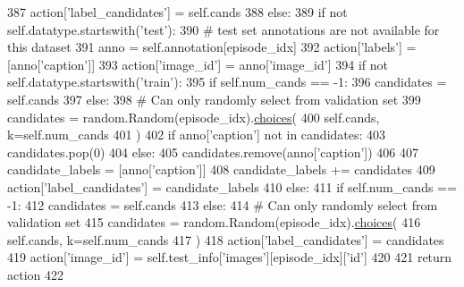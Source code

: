 \begin{DoxyCode}
387                     action[\textcolor{stringliteral}{'label\_candidates'}] = self.cands
388         \textcolor{keywordflow}{else}:
389             \textcolor{keywordflow}{if} \textcolor{keywordflow}{not} self.datatype.startswith(\textcolor{stringliteral}{'test'}):
390                 \textcolor{comment}{# test set annotations are not available for this dataset}
391                 anno = self.annotation[episode\_idx]
392                 action[\textcolor{stringliteral}{'labels'}] = [anno[\textcolor{stringliteral}{'caption'}]]
393                 action[\textcolor{stringliteral}{'image\_id'}] = anno[\textcolor{stringliteral}{'image\_id'}]
394                 \textcolor{keywordflow}{if} \textcolor{keywordflow}{not} self.datatype.startswith(\textcolor{stringliteral}{'train'}):
395                     \textcolor{keywordflow}{if} self.num\_cands == -1:
396                         candidates = self.cands
397                     \textcolor{keywordflow}{else}:
398                         \textcolor{comment}{# Can only randomly select from validation set}
399                         candidates = random.Random(episode\_idx).\hyperlink{namespaceparlai_1_1mturk_1_1tasks_1_1personachat_1_1personachat__chat_1_1extract__and__save__personas_a71338ed717c1e7ba7c54bfff02589e4e}{choices}(
400                             self.cands, k=self.num\_cands
401                         )
402                     \textcolor{keywordflow}{if} anno[\textcolor{stringliteral}{'caption'}] \textcolor{keywordflow}{not} \textcolor{keywordflow}{in} candidates:
403                         candidates.pop(0)
404                     \textcolor{keywordflow}{else}:
405                         candidates.remove(anno[\textcolor{stringliteral}{'caption'}])
406 
407                     candidate\_labels = [anno[\textcolor{stringliteral}{'caption'}]]
408                     candidate\_labels += candidates
409                     action[\textcolor{stringliteral}{'label\_candidates'}] = candidate\_labels
410             \textcolor{keywordflow}{else}:
411                 \textcolor{keywordflow}{if} self.num\_cands == -1:
412                     candidates = self.cands
413                 \textcolor{keywordflow}{else}:
414                     \textcolor{comment}{# Can only randomly select from validation set}
415                     candidates = random.Random(episode\_idx).\hyperlink{namespaceparlai_1_1mturk_1_1tasks_1_1personachat_1_1personachat__chat_1_1extract__and__save__personas_a71338ed717c1e7ba7c54bfff02589e4e}{choices}(
416                         self.cands, k=self.num\_cands
417                     )
418                 action[\textcolor{stringliteral}{'label\_candidates'}] = candidates
419                 action[\textcolor{stringliteral}{'image\_id'}] = self.test\_info[\textcolor{stringliteral}{'images'}][episode\_idx][\textcolor{stringliteral}{'id'}]
420 
421         \textcolor{keywordflow}{return} action
422 
\end{DoxyCode}
